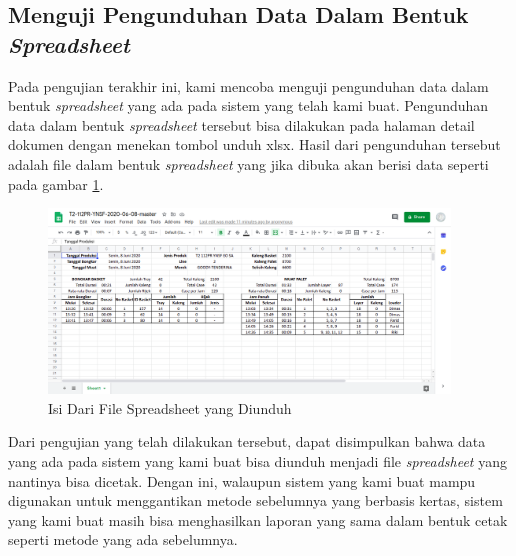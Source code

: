 \subsection{Menguji Pengunduhan Data Dalam Bentuk \emph{Spreadsheet}}
\vspace{1ex}

Pada pengujian terakhir ini, kami mencoba menguji pengunduhan data dalam bentuk \emph{spreadsheet} yang ada pada sistem yang telah kami buat.
Pengunduhan data dalam bentuk \emph{spreadsheet} tersebut bisa dilakukan pada halaman detail dokumen dengan menekan tombol unduh xlsx.
Hasil dari pengunduhan tersebut adalah file dalam bentuk \emph{spreadsheet} yang jika dibuka akan berisi data seperti pada gambar \ref{fig:isiSpreadsheet}.
\vspace{0.5ex}

\newpage

\begin{figure} [ht!] \centering
  \includegraphics[width=0.95\textwidth]{gambar/isi-spreadsheet.png}
  \caption{Isi Dari File Spreadsheet yang Diunduh}
  \label{fig:isiSpreadsheet}
\end{figure}

Dari pengujian yang telah dilakukan tersebut, dapat disimpulkan bahwa data yang ada pada sistem yang kami buat bisa diunduh menjadi file \emph{spreadsheet} yang nantinya bisa dicetak.
Dengan ini, walaupun sistem yang kami buat mampu digunakan untuk menggantikan metode sebelumnya yang berbasis kertas, sistem yang kami buat masih bisa menghasilkan laporan yang sama dalam bentuk cetak seperti metode yang ada sebelumnya.
\vspace{0.5ex}
